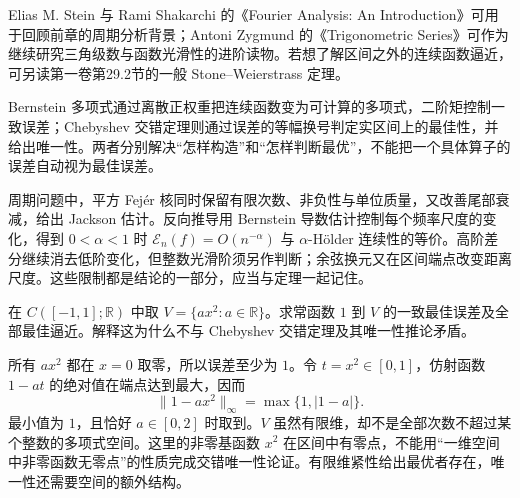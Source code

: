 \ProseParagraphBreak

Elias M. Stein 与 Rami Shakarchi 的《Fourier Analysis: An Introduction》\cite{Stein2003Fourier}可用于回顾前章的周期分析背景；Antoni Zygmund 的《Trigonometric Series》\cite{Zygmund2002Trigonometric}可作为继续研究三角级数与函数光滑性的进阶读物。若想了解区间之外的连续函数逼近，可另读第一卷第29.2节的一般 Stone--Weierstrass 定理。








\begin{chaptersummary}
Bernstein 多项式通过离散正权重把连续函数变为可计算的多项式，二阶矩控制一致误差；Chebyshev 交错定理则通过误差的等幅换号判定实区间上的最佳性，并给出唯一性。两者分别解决“怎样构造”和“怎样判断最优”，不能把一个具体算子的误差自动视为最佳误差。

周期问题中，平方 Fejér 核同时保留有限次数、非负性与单位质量，又改善尾部衰减，给出 Jackson 估计。反向推导用 Bernstein 导数估计控制每个频率尺度的变化，得到 \(0<\alpha<1\) 时 \(\mathcal E_n(f)=O(n^{-\alpha})\) 与 \(\alpha\)-Hölder 连续性的等价。高阶差分继续消去低阶变化，但整数光滑阶须另作判断；余弦换元又在区间端点改变距离尺度。这些限制都是结论的一部分，应当与定理一起记住。
\end{chaptersummary}

\BookExercises

\begin{exercise}[子空间中的非唯一性]\label{b2:ex:approximation-nonunique}
在 \(C([-1,1];\mathbb R)\) 中取 \(V=\{ax^2:a\in\mathbb R\}\)。求常函数 \(1\) 到 \(V\) 的一致最佳误差及全部最佳逼近。解释这为什么不与 Chebyshev 交错定理及其唯一性推论矛盾。
\end{exercise}
\begin{solution}
所有 \(ax^2\) 都在 \(x=0\) 取零，所以误差至少为 \(1\)。令 \(t=x^2\in[0,1]\)，仿射函数 \(1-at\) 的绝对值在端点达到最大，因而
\[
 \|1-ax^2\|_\infty=\max\{1,|1-a|\}.
\]
最小值为 \(1\)，且恰好 \(a\in[0,2]\) 时取到。\(V\) 虽然有限维，却不是全部次数不超过某个整数的多项式空间。这里的非零基函数 \(x^2\) 在区间中有零点，不能用“一维空间中非零函数无零点”的性质完成交错唯一性论证。有限维紧性给出最优者存在，唯一性还需要空间的额外结构。
\end{solution}

